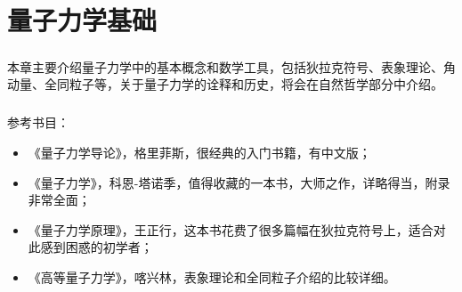 \chapter{量子力学基础}
\paragraph{}
本章主要介绍量子力学中的基本概念和数学工具，包括狄拉克符号、表象理论、角动量、全同粒子等，关于量子力学的诠释和历史，将会在自然哲学部分中介绍。
\paragraph{}
参考书目：
\begin{itemize}
    \item 《量子力学导论》，格里菲斯，很经典的入门书籍，有中文版；
    \item 《量子力学》，科恩-塔诺季，值得收藏的一本书，大师之作，详略得当，附录非常全面；
    \item 《量子力学原理》，王正行，这本书花费了很多篇幅在狄拉克符号上，适合对此感到困惑的初学者；
    \item 《高等量子力学》，喀兴林，表象理论和全同粒子介绍的比较详细。
\end{itemize}
